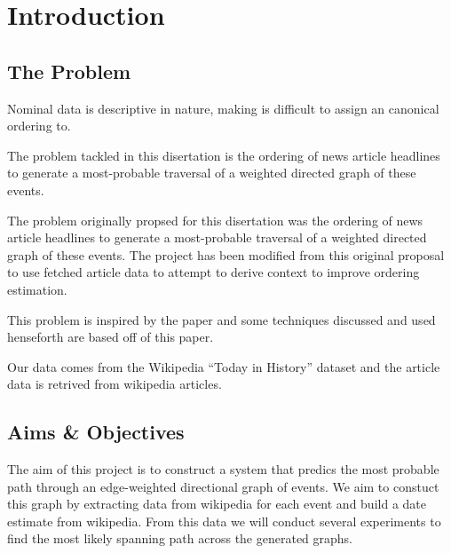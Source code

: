 \documentclass[12pt]{report}
\begin{document}
\maketitle

\tableofcontents

\chapter{Introduction}
        \section{The Problem}
        Nominal data is descriptive in nature, making is difficult to assign an canonical ordering to.
        
        The problem tackled in this disertation is the ordering of news article headlines to generate
        a most-probable traversal of a weighted directed graph of these events.

        The problem originally propsed for this disertation was the ordering of news article headlines
        to generate a most-probable traversal of a weighted directed graph of these events. The project
        has been modified from this original proposal to use fetched article data to attempt to derive
        context to improve ordering estimation.

        This problem is inspired by the paper \cite{abend2015lexical} and some
        techniques discussed and used henseforth are based off of this paper.


        Our data comes from the Wikipedia ``Today in History'' dataset and the article data is retrived
        from wikipedia articles.

        \section{Aims \& Objectives}
        The aim of this project is to construct a system that predics the most probable path
        through an edge-weighted directional graph of events.
        We aim to constuct this graph by extracting data from wikipedia for each event and
        build a date estimate from wikipedia. From this data we will conduct several experiments
        to find the most likely spanning path across the generated graphs.
\end{document}
